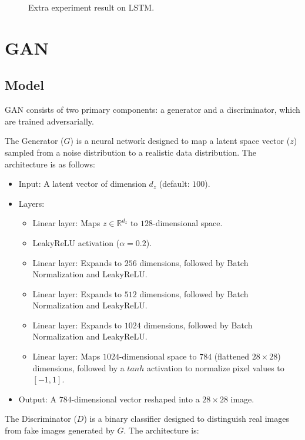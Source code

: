\documentclass[12pt]{article}
\begin{document}
\begin{figure}[htbp]
\begin{minipage}{0.3\textwidth}
        \caption{Extra experiment result on LSTM.}
        \label{fig:p3}
    \end{minipage}
\end{figure}

\section{GAN}

\subsection{Model}

GAN consists of two primary components: a generator and a discriminator, which are trained adversarially.

The Generator (\(G\)) is a neural network designed to map a latent space vector (\(z\)) sampled from a noise distribution to a realistic data distribution. The architecture is as follows:

\begin{itemize}
    \item Input: A latent vector of dimension \(d_{z}\) (default: \(100\)).
    \item Layers:
        \begin{itemize}
            \item Linear layer: Maps \(z \in \mathbb{R}^{d_z}\) to \(128\)-dimensional space.
            \item LeakyReLU activation (\(\alpha=0.2\)).
            \item Linear layer: Expands to \(256\) dimensions, followed by Batch Normalization and LeakyReLU.
            \item Linear layer: Expands to \(512\) dimensions, followed by Batch Normalization and LeakyReLU.
            \item Linear layer: Expands to \(1024\) dimensions, followed by Batch Normalization and LeakyReLU.
            \item Linear layer: Maps \(1024\)-dimensional space to \(784\) (flattened \(28\times28\)) dimensions, followed by a \(tanh\) activation to normalize pixel values to \([-1, 1]\).
        \end{itemize}
    \item Output: A \(784\)-dimensional vector reshaped into a \(28\times28\) image.
\end{itemize}

The Discriminator (\(D\)) is a binary classifier designed to distinguish real images from fake images generated by \(G\). The architecture is:
\end{document}
